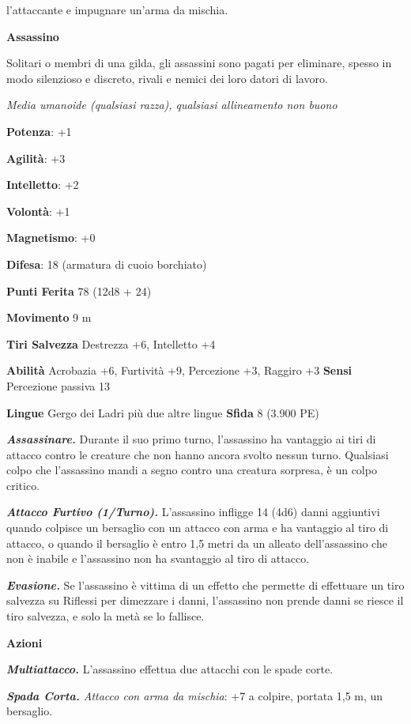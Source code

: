 \begin{multicols}{2}
l'attaccante e impugnare un'arma da mischia.

\textbf{Assassino}

Solitari o membri di una gilda, gli assassini sono pagati per eliminare,
spesso in modo silenzioso e discreto, rivali e nemici dei loro datori di
lavoro.

\emph{Media umanoide (qualsiasi razza), qualsiasi allineamento non
buono}

\textbf{Potenza}: +1

\textbf{Agilità}: +3

\textbf{Intelletto}: +2

\textbf{Volontà}: +1

\textbf{Magnetismo}: +0

\textbf{Difesa}: 18 (armatura di cuoio borchiato)

\textbf{Punti Ferita} 78 (12d8 + 24)

\textbf{Movimento} 9 m

\textbf{Tiri Salvezza} Destrezza +6, Intelletto +4

\textbf{Abilità} Acrobazia +6, Furtività +9, Percezione +3, Raggiro +3
\textbf{Sensi} Percezione passiva 13

\textbf{Lingue} Gergo dei Ladri più due altre lingue \textbf{Sfida} 8
(3.900 PE)

\emph{\textbf{Assassinare.}} Durante il suo primo turno, l'assassino ha
vantaggio ai tiri di attacco contro le creature che non hanno ancora
svolto nessun turno. Qualsiasi colpo che l'assassino mandi a segno
contro una creatura sorpresa, è un colpo critico.

\emph{\textbf{Attacco Furtivo (1/Turno).}} L'assassino infligge 14 (4d6)
danni aggiuntivi quando colpisce un bersaglio con un attacco con arma e
ha vantaggio al tiro di attacco, o quando il bersaglio è entro 1,5 metri
da un alleato dell'assassino che non è inabile e l'assassino non ha
svantaggio al tiro di attacco.

\emph{\textbf{Evasione.}} Se l'assassino è vittima di un effetto che
permette di effettuare un tiro salvezza su Riflessi per dimezzare i
danni, l'assassino non prende danni se riesce il tiro salvezza, e solo
la metà se lo fallisce.

\textbf{Azioni}

\emph{\textbf{Multiattacco.}} L'assassino effettua due attacchi con le
spade corte.

\emph{\textbf{Spada Corta.} Attacco con arma da mischia}: +7 a colpire,
portata 1,5 m, un bersaglio.


\end{multicols}
